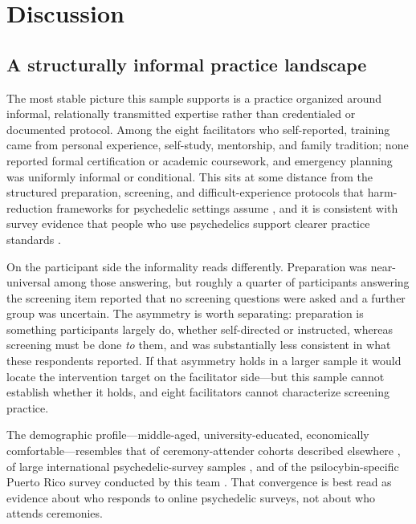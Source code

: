 \documentclass[12pt]{article}
\begin{document}
\section{Discussion}

\subsection{A structurally informal practice landscape}

The most stable picture this sample supports is a practice organized around informal, relationally
transmitted expertise rather than credentialed or documented protocol. Among the eight facilitators who
self-reported, training came from personal experience, self-study, mentorship, and family tradition; none
reported formal certification or academic coursework, and emergency planning was uniformly informal or
conditional. This sits at some distance from the structured preparation, screening, and difficult-experience
protocols that harm-reduction frameworks for psychedelic settings assume
\citep{gorman2021psychedelic,pilecki2021ethical,dutton2025harm}, and it is consistent with survey evidence
that people who use psychedelics support clearer practice standards \citep{kruger2023preferences}.

On the participant side the informality reads differently. Preparation was near-universal among those
answering, but roughly a quarter of participants answering the screening item reported that no screening
questions were asked and a further group was uncertain. The asymmetry is worth separating: preparation is
something participants largely do, whether self-directed or instructed, whereas screening must be done
\emph{to} them, and was substantially less consistent in what these respondents reported. If that
asymmetry holds in a larger sample it would locate the intervention target on the facilitator side---but
this sample cannot establish whether it holds, and eight facilitators cannot characterize screening
practice.

The demographic profile---middle-aged, university-educated, economically comfortable---resembles that of
ceremony-attender cohorts described elsewhere \citep{teixeira2026ayahuasca,pagni2025longterm}, of large
international psychedelic-survey samples \citep{kopra2023investigation,robinson2026field}, and of the
psilocybin-specific Puerto Rico survey conducted by this team \citep{velezrodriguez2026psilocybin}. That
convergence is best read as evidence about who responds to online psychedelic surveys, not about who
attends ceremonies.
\end{document}
